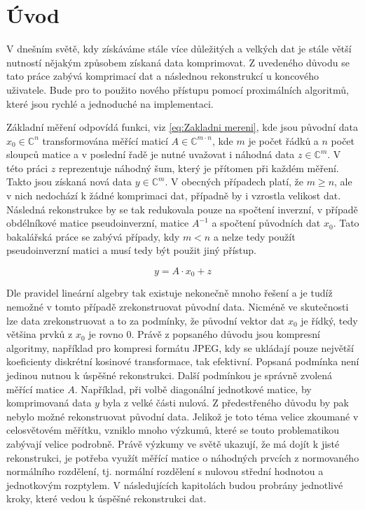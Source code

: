 \documentclass[FM,BP]{tulthesis}
\newcounter{Vzorce}
\begin{document}
\pagebreak

\renewcommand{\baselinestretch}{1.50}
\setlength\parindent{1.2cm}
\selectfont

\chapter{Úvod}
\label{ch:uvod}
 V dnešním světě, kdy získáváme stále více důležitých a velkých dat je stále větší nutností nějakým způsobem získaná data komprimovat. Z uvedeného důvodu se tato práce zabývá komprimací dat a následnou rekonstrukcí u koncového uživatele. Bude pro to použito nového přístupu pomocí proximálních algoritmů, které jsou rychlé a jednoduché na implementaci.

Základní měření odpovídá funkci, viz \ref{eq:Zakladni mereni}, kde jsou původní data $x_0 \in \mathbb{C}^n$ transformována měřící maticí $A \in \mathbb{C} ^{m \cdot n}$, kde $m$ je počet řádků a $n$ počet sloupců matice a v poslední řadě je nutné uvažovat i náhodná data $z \in \mathbb{C}^m$. V této práci $z$ reprezentuje náhodný šum, který je přítomen při každém měření. Takto jsou získaná nová data $y \in \mathbb{C}^m$. V obecných případech platí, že $m \geq n$, ale v nich nedochází k žádné komprimaci dat, případně by i vzrostla velikost dat. Následná rekonstrukce by se tak redukovala pouze na spočtení inverzní, v případě obdélníkové matice pseudoinverzní, matice $A^{-1}$ a spočtení původních dat $x_0$. Tato bakalářská práce se zabývá případy, kdy $m < n$ a nelze tedy použít pseudoinverzní matici a musí tedy být použit jiný přístup.

\begin{equation} \label{eq:Zakladni mereni} \tag{Vzorec \theVzorce}
y = A \cdot x_0 + z
\end{equation}

Dle pravidel lineární algebry tak existuje nekonečně mnoho řešení a je tudíž nemožné v tomto případě zrekonstruovat původní data. Nicméně ve skutečnosti lze data zrekonstruovat a to za podmínky, že původní vektor dat $x_0$ je řídký, tedy většina prvků z $x_0$ je rovno $0$. Právě z popsaného důvodu jsou kompresní algoritmy, například pro kompresi formátu JPEG, kdy se ukládají pouze největší koeficienty diskrétní kosinové transformace, tak efektivní. Popsaná podmínka není jedinou nutnou k úspěšné rekonstrukci. Další podmínkou je správně zvolená měřící matice $A$. Například, při volbě diagonální jednotkové matice, by komprimovaná data $y$ byla z velké části nulová. Z předestřeného důvodu by pak nebylo možné rekonstruovat původní data. Jelikož je toto téma velice zkoumané v celosvětovém měřítku, vzniklo mnoho výzkumů, které se touto problematikou zabývají velice podrobně. Právě výzkumy ve světě ukazují, že má dojít k jisté rekonstrukci, je potřeba využít měřící matice o náhodných prvcích z normovaného normálního rozdělení, tj. normální rozdělení s nulovou střední hodnotou a jednotkovým rozptylem. V následujících kapitolách budou probrány jednotlivé kroky, které vedou k úspěšné rekonstrukci dat.
\end{document}
